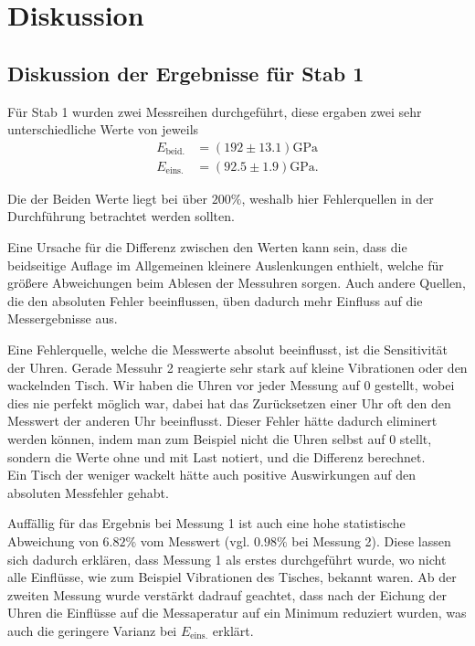 \section{Diskussion}
\label{sec:Diskussion}

\subsection{Diskussion der Ergebnisse für Stab 1}
\label{sec:diskussion-stab1}

Für Stab 1 wurden zwei Messreihen durchgeführt, diese ergaben zwei sehr 
unterschiedliche Werte von jeweils
\begin{align}
	E_\text{beid.} &= (192 \pm 13.1) \si{\giga\pascal} \\
	E_\text{eins.} &= (92.5 \pm 1.9) \si{\giga\pascal}.
\end{align}

Die der Beiden Werte liegt bei über $200\%$,
weshalb hier Fehlerquellen in der Durchführung betrachtet werden sollten.

Eine Ursache für die Differenz zwischen den Werten kann sein, dass die beidseitige
Auflage im Allgemeinen kleinere Auslenkungen enthielt, welche für größere 
Abweichungen beim Ablesen der Messuhren sorgen. Auch andere Quellen, die den absoluten
Fehler beeinflussen, üben dadurch mehr Einfluss auf die Messergebnisse aus.

Eine Fehlerquelle, welche die Messwerte absolut beeinflusst, ist die 
Sensitivität der Uhren. Gerade Messuhr 2 reagierte sehr stark auf kleine Vibrationen 
oder den wackelnden Tisch. Wir haben die Uhren vor jeder Messung auf 0 gestellt,
wobei dies nie perfekt möglich war, dabei hat das Zurücksetzen einer Uhr oft den 
den Messwert der anderen Uhr beeinflusst.
Dieser Fehler hätte dadurch eliminert werden können, indem man zum Beispiel nicht 
die Uhren selbst auf 0 stellt, sondern die Werte ohne und mit Last notiert, und
die Differenz berechnet.
\\
Ein Tisch der weniger wackelt hätte auch positive Auswirkungen auf den absoluten
Messfehler gehabt.

Auffällig für das Ergebnis bei Messung 1 ist auch eine hohe statistische 
Abweichung von $6.82\%$ vom Messwert (vgl. $0.98\%$ bei Messung 2). Diese lassen sich dadurch
erklären, dass Messung 1 als erstes durchgeführt wurde, wo nicht alle Einflüsse, wie zum Beispiel 
Vibrationen des Tisches, bekannt waren. Ab der zweiten Messung wurde verstärkt dadrauf geachtet, 
dass nach der Eichung der Uhren die Einflüsse auf die Messaperatur auf ein Minimum reduziert wurden,
was auch die geringere Varianz bei $E_\text{eins.}$ erklärt.

